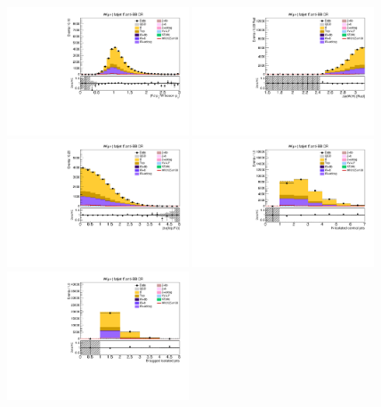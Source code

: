 \begin{figure}[tbp]
  \begin{center}
    \includegraphics[width=0.48\textwidth]{figures/wlnhbb2016/boosted/WmnWHTT1bFJCR_fj1WPtBalance.pdf}
    \includegraphics[width=0.48\textwidth]{figures/wlnhbb2016/boosted/WmnWHTT1bFJCR_deltaPhiVH.pdf}
    \includegraphics[width=0.48\textwidth]{figures/wlnhbb2016/boosted/WmnWHTT1bFJCR_dEtal1fj1.pdf}
    \includegraphics[width=0.48\textwidth]{figures/wlnhbb2016/boosted/WmnWHTT1bFJCR_nIsojet.pdf}
    \includegraphics[width=0.48\textwidth]{figures/wlnhbb2016/boosted/WmnWHTT1bFJCR_isojetNBtags.pdf}

\end{center}
\end{figure}
